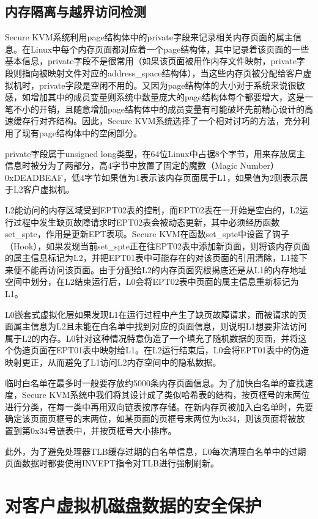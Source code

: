 \subsection{内存隔离与越界访问检测}
Secure KVM系统利用page结构体中的private字段来记录相关内存页面的属主信息。在Linux中每个内存页面都对应着一个page结构体，其中记录着该页面的一些基本信息，private字段不是很常用（如果该页面被用作内存文件映射，private字段则指向被映射文件对应的address\_space结构体），当这些内存页被分配给客户虚拟机时，private字段是空闲不用的。又因为page结构体的大小对于系统来说很敏感，如增加其中的成员变量则系统中数量庞大的page结构体每个都要增大，这是一笔不小的开销，且随意增加page结构体中的成员变量有可能破坏先前精心设计的高速缓存行对齐结构。因此，Secure KVM系统选择了一个相对讨巧的方法，充分利用了现有page结构体中的空闲部分。

private字段属于unsigned long类型，在64位Linux中占据8个字节，用来存放属主信息时被分为了两部分，高4字节中放置了固定的魔数（Magic Number）0xDEADBEAF，低4字节如果值为1表示该内存页面属于L1，如果值为2则表示属于L2客户虚拟机。

L2能访问的内存区域受到EPT02表的控制，而EPT02表在一开始是空白的，L2运行过程中发生缺页故障请求时EPT02表会被动态更新，其中必须经历函数set\_spte，作用是更新EPT表项。Secure KVM在函数set\_spte中设置了钩子（Hook），如果发现当前set\_spte正在往EPT02表中添加新页面，则将该内存页面的属主信息标记为L2，并把EPT01表中可能存在的对该页面的引用清除，L1接下来便不能再访问该页面。由于分配给L2的内存页面究根揭底还是从L1的内存地址空间中划分，在L2结束运行后，L0会将EPT02表中页面的属主信息重新标记为L1。

L0嵌套式虚拟化层如果发现L1在运行过程中产生了缺页故障请求，而被请求的页面属主信息为L2且未能在白名单中找到对应的页面信息，则说明L1想要非法访问属于L2的内存。L0针对这种情况特意伪造了一个填充了随机数据的页面，并将这个伪造页面在EPT01表中映射给L1。在L2运行结束后，L0会将EPT01表中的伪造映射更正，从而避免了L1访问L2内存空间中的隐私数据。

临时白名单在最多时一般要存放约5000条内存页面信息。为了加快白名单的查找速度，Secure KVM系统中我们将其设计成了类似哈希表的结构，按页框号的末两位进行分类，在每一类中再用双向链表按序存储。在新内存页被加入白名单时，先要确定该页面页框号的末两位，如某页面的页框号末两位为0x34，则该页面将被放置到第0x34号链表中，并按页框号大小排序。

此外，为了避免处理器TLB缓存过期的白名单信息，L0每次清理白名单中的过期页面数据时都要使用INVEPT指令对TLB进行强制刷新。

\section{对客户虚拟机磁盘数据的安全保护}

